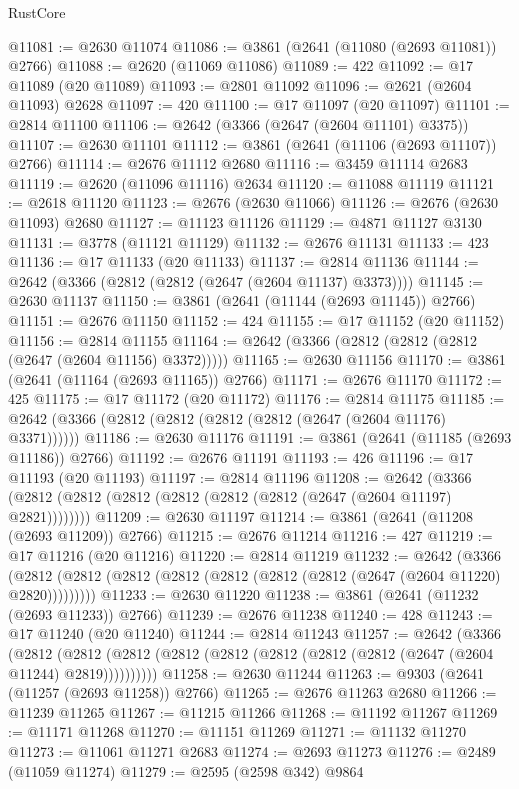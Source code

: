 \begin{lexlean}{RustCore}
\begin{coremodule}
@11081 := @2630 @11074
@11086 := @3861 (@2641 (@11080 (@2693 @11081)) @2766)
@11088 := @2620 (@11069 @11086)
@11089 := 422
@11092 := @17 @11089 (@20 @11089)
@11093 := @2801 @11092
@11096 := @2621 (@2604 @11093) @2628
@11097 := 420
@11100 := @17 @11097 (@20 @11097)
@11101 := @2814 @11100
@11106 := @2642 (@3366 (@2647 (@2604 @11101) @3375))
@11107 := @2630 @11101
@11112 := @3861 (@2641 (@11106 (@2693 @11107)) @2766)
@11114 := @2676 @11112 @2680
@11116 := @3459 @11114 @2683
@11119 := @2620 (@11096 @11116) @2634
@11120 := @11088 @11119
@11121 := @2618 @11120
@11123 := @2676 (@2630 @11066)
@11126 := @2676 (@2630 @11093) @2680
@11127 := @11123 @11126
@11129 := @4871 @11127 @3130
@11131 := @3778 (@11121 @11129)
@11132 := @2676 @11131
@11133 := 423
@11136 := @17 @11133 (@20 @11133)
@11137 := @2814 @11136
@11144 := @2642 (@3366 (@2812 (@2812 (@2647 (@2604 @11137) @3373))))
@11145 := @2630 @11137
@11150 := @3861 (@2641 (@11144 (@2693 @11145)) @2766)
@11151 := @2676 @11150
@11152 := 424
@11155 := @17 @11152 (@20 @11152)
@11156 := @2814 @11155
@11164 := @2642 (@3366 (@2812 (@2812 (@2812 (@2647 (@2604 @11156) @3372)))))
@11165 := @2630 @11156
@11170 := @3861 (@2641 (@11164 (@2693 @11165)) @2766)
@11171 := @2676 @11170
@11172 := 425
@11175 := @17 @11172 (@20 @11172)
@11176 := @2814 @11175
@11185 := @2642 (@3366 (@2812 (@2812 (@2812 (@2812 (@2647 (@2604 @11176) @3371))))))
@11186 := @2630 @11176
@11191 := @3861 (@2641 (@11185 (@2693 @11186)) @2766)
@11192 := @2676 @11191
@11193 := 426
@11196 := @17 @11193 (@20 @11193)
@11197 := @2814 @11196
@11208 := @2642 (@3366 (@2812 (@2812 (@2812 (@2812 (@2812 (@2812 (@2647 (@2604 @11197) @2821))))))))
@11209 := @2630 @11197
@11214 := @3861 (@2641 (@11208 (@2693 @11209)) @2766)
@11215 := @2676 @11214
@11216 := 427
@11219 := @17 @11216 (@20 @11216)
@11220 := @2814 @11219
@11232 := @2642
    (@3366 (@2812 (@2812 (@2812 (@2812 (@2812 (@2812 (@2812 (@2647 (@2604 @11220) @2820)))))))))
@11233 := @2630 @11220
@11238 := @3861 (@2641 (@11232 (@2693 @11233)) @2766)
@11239 := @2676 @11238
@11240 := 428
@11243 := @17 @11240 (@20 @11240)
@11244 := @2814 @11243
@11257 := @2642
    (@3366
      (@2812 (@2812 (@2812 (@2812 (@2812 (@2812 (@2812 (@2812 (@2647 (@2604 @11244) @2819))))))))))
@11258 := @2630 @11244
@11263 := @9303 (@2641 (@11257 (@2693 @11258)) @2766)
@11265 := @2676 @11263 @2680
@11266 := @11239 @11265
@11267 := @11215 @11266
@11268 := @11192 @11267
@11269 := @11171 @11268
@11270 := @11151 @11269
@11271 := @11132 @11270
@11273 := @11061 @11271 @2683
@11274 := @2693 @11273
@11276 := @2489 (@11059 @11274)
@11279 := @2595 (@2598 @342) @9864

\end{coremodule}
\end{lexlean}
